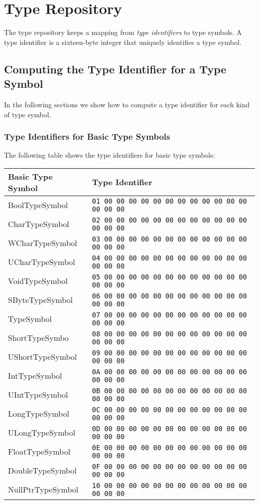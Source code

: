 \documentclass[a4paper,oneside,11pt]{book}
\theoremstyle{definition}
\begin{document}
\chapter{Type Repository}

The type repository keeps a mapping from \emph{type identifiers} to type symbols.
A type identifier is a sixteen-byte integer that uniquely identifies a type symbol.

\section{Computing the Type Identifier for a Type Symbol}

In the following sections we show how to compute a type identifier for each kind of type symbol.

\subsection{Type Identifiers for Basic Type Symbols}

The following table shows the type identifiers for basic type symbols:

\begin{flushleft}
\begin{supertabular}{ll}
\textbf{Basic Type Symbol}& \textbf{Type Identifier}\\
\hline
BoolTypeSymbol& \verb|01 00 00 00 00 00 00 00 00 00 00 00 00 00 00 00|\\
CharTypeSymbol& \verb|02 00 00 00 00 00 00 00 00 00 00 00 00 00 00 00|\\
WCharTypeSymbol& \verb|03 00 00 00 00 00 00 00 00 00 00 00 00 00 00 00|\\
UCharTypeSymbol& \verb|04 00 00 00 00 00 00 00 00 00 00 00 00 00 00 00|\\
VoidTypeSymbol& \verb|05 00 00 00 00 00 00 00 00 00 00 00 00 00 00 00|\\
SByteTypeSymbol& \verb|06 00 00 00 00 00 00 00 00 00 00 00 00 00 00 00|\\
TypeSymbol& \verb|07 00 00 00 00 00 00 00 00 00 00 00 00 00 00 00|\\
ShortTypeSymbo& \verb|08 00 00 00 00 00 00 00 00 00 00 00 00 00 00 00|\\
UShortTypeSymbol& \verb|09 00 00 00 00 00 00 00 00 00 00 00 00 00 00 00|\\
IntTypeSymbol& \verb|0A 00 00 00 00 00 00 00 00 00 00 00 00 00 00 00|\\
UIntTypeSymbol& \verb|0B 00 00 00 00 00 00 00 00 00 00 00 00 00 00 00|\\
LongTypeSymbol& \verb|0C 00 00 00 00 00 00 00 00 00 00 00 00 00 00 00|\\
ULongTypeSymbol& \verb|0D 00 00 00 00 00 00 00 00 00 00 00 00 00 00 00|\\
FloatTypeSymbol& \verb|0E 00 00 00 00 00 00 00 00 00 00 00 00 00 00 00|\\
DoubleTypeSymbol& \verb|0F 00 00 00 00 00 00 00 00 00 00 00 00 00 00 00|\\
NullPtrTypeSymbol& \verb|10 00 00 00 00 00 00 00 00 00 00 00 00 00 00 00|\\
\hline
\end{supertabular}
\end{flushleft}
\end{document}
